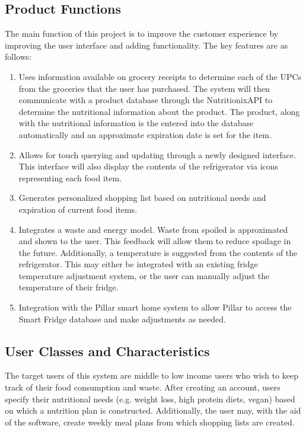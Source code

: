 \subsection{Product Functions} The main function of this project is to improve the customer experience by improving the user interface and adding functionality. The key features are as follows:
\begin{enumerate}
	\item Uses information available on grocery receipts to determine each of the UPCs from the groceries that the user has purchased. The system will then communicate with a product database through the Nutritionix\texttrademark API to determine the nutritional information about the product. The product, along with the nutritional information is the entered into the database automatically and an approximate expiration date is set for the item.  
	\item Allows for touch querying and updating through a newly designed interface. This interface will also display the contents of the refrigerator via icons representing each food item. 
	\item Generates personalized shopping list based on nutritional needs and expiration of current food items. 
	\item Integrates a waste and energy model. Waste from spoiled is approximated and shown to the user. This feedback will allow them to reduce spoilage in the future. Additionally, a  temperature is suggested from the contents of the refrigerator. This may either be integrated with an existing fridge temperature adjustment system, or the user can manually adjust the temperature of their fridge. 
	\item Integration with the Pillar smart home system to allow Pillar to access the Smart Fridge database and make adjustments as needed. 
\end{enumerate}


\subsection{User Classes and Characteristics}

The target users of this system are middle to low income users who wish to keep track of their food consumption and waste. After creating an account, users specify their nutritional needs (e.g. weight loss, high protein diets, vegan) based on which a nutrition plan is constructed. Additionally, the user may, with the aid of the software, create weekly meal plans from which shopping lists are created.  

